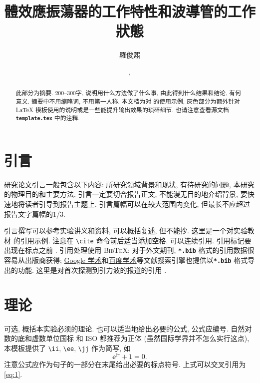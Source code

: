 \documentclass[font=default]{mpltx}
\makeatletter
\newcommand{\note}[1]{{\color{gray}#1}}
\newcommand*\cs[1]{\texttt{\textbackslash #1}}
\newcommand*\file[1]{\textbf{\texttt{#1}}}
\newcommand\releasedate{%
    \href{https://github.com/CastleStar14654/PKUMpLtX/releases/tag/\mpltx@fileversion}%
        {\mpltx@filedate, \mpltx@fileversion}}
\makeatother
\begin{document}
\title{體效應振蕩器的工作特性和波導管的工作狀態} %
\author{羅俊熙} %
\date{\releasedate}
\begin{abstract}
	此部分为摘要.
	200--300字, 说明用什么方法做了什么事, 由此得到什么结果和结论, 有何意义.
	摘要中不用缩略词, 不用第一人称.
	\note{本文档为对 \href{https://github.com/CastleStar14654/PKUMpLtX}{\pkg*{PKUMpLtX}} 的使用示例, 灰色部分为额外针对 \LaTeX{} 模板使用的说明或是一些能提升输出效果的琐碎细节.
		也请注意查看源文档 \file{template.tex} 中的注释.}
\end{abstract}

\maketitle

\section{引言}

研究论文引言一般包含以下内容:
所研究领域背景和现状,
有待研究的问题,
本研究的物理目的和主要方法.
引言一定要切合报告正文, 不能漫无目的地介绍背景, 要快速地将读者引导到报告主题上.
引言篇幅可以在较大范围内变化, 但最长不应超过报告文字篇幅的1/3.

引言撰写可以参考实验讲义和资料, 可以概括复述, 但不能抄.
\note{这里是一个对实验教材 \cite{jindaishiyan} 的引用示例.}
\note{注意在 \cs{cite} 命令前后适当添加空格.
	可以连续引用.
	引用标记要出现在标点之前 \cite{GBT7714,pr}.
	引用处理使用 \textsc{Bib\TeX};
	对于外文期刊, \file{*.bib} 格式的引用数据很容易从出版商获得;
	\href{https://scholar.google.com}{Google 学术}和\href{https://xueshu.baidu.com}{百度学术}等文献搜索引擎也提供以\file{*.bib} 格式导出的功能.
	这里是对首次探测到引力波的报道的引用 \cite{PhysRevLett.116.061102}.}

\section{理论}\label{sec:theory}
可选, 概括本实验必须的理论.
也可以适当地给出必要的公式, 公式应编号.
\note{自然对数的底和虚数单位国标 \cite{GBT3102.11} 和 ISO \cite{ISO80000-2} 都推荐为正体 (虽然国际学界并不怎么实行这点), 本模板提供了 \cs{ii}, \cs{ee}, \cs{jj} 作为简写, 如
	\begin{equation}\label{eq:1}
		\ee^{\ii\pi}+1=0.
	\end{equation}
	注意公式应作为句子的一部分在末尾给出必要的标点符号.
	上式可以交叉引用为\autoref{eq:1}.}
\end{document}
